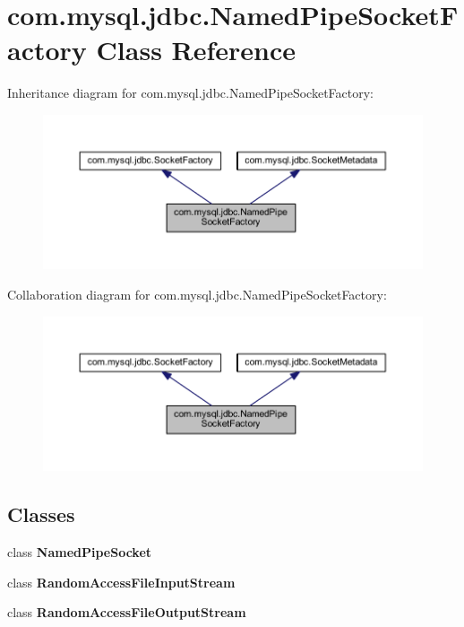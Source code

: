 \hypertarget{classcom_1_1mysql_1_1jdbc_1_1_named_pipe_socket_factory}{}\section{com.\+mysql.\+jdbc.\+Named\+Pipe\+Socket\+Factory Class Reference}
\label{classcom_1_1mysql_1_1jdbc_1_1_named_pipe_socket_factory}


Inheritance diagram for com.\+mysql.\+jdbc.\+Named\+Pipe\+Socket\+Factory\+:
\nopagebreak
\begin{figure}[H]
\begin{center}
\leavevmode
\includegraphics[width=350pt]{classcom_1_1mysql_1_1jdbc_1_1_named_pipe_socket_factory__inherit__graph}
\end{center}
\end{figure}


Collaboration diagram for com.\+mysql.\+jdbc.\+Named\+Pipe\+Socket\+Factory\+:
\nopagebreak
\begin{figure}[H]
\begin{center}
\leavevmode
\includegraphics[width=350pt]{classcom_1_1mysql_1_1jdbc_1_1_named_pipe_socket_factory__coll__graph}
\end{center}
\end{figure}
\subsection*{Classes}
\begin{DoxyCompactItemize}
\item 
class {\bfseries Named\+Pipe\+Socket}
\item 
class {\bfseries Random\+Access\+File\+Input\+Stream}
\item 
class {\bfseries Random\+Access\+File\+Output\+Stream}
\end{DoxyCompactItemize}
